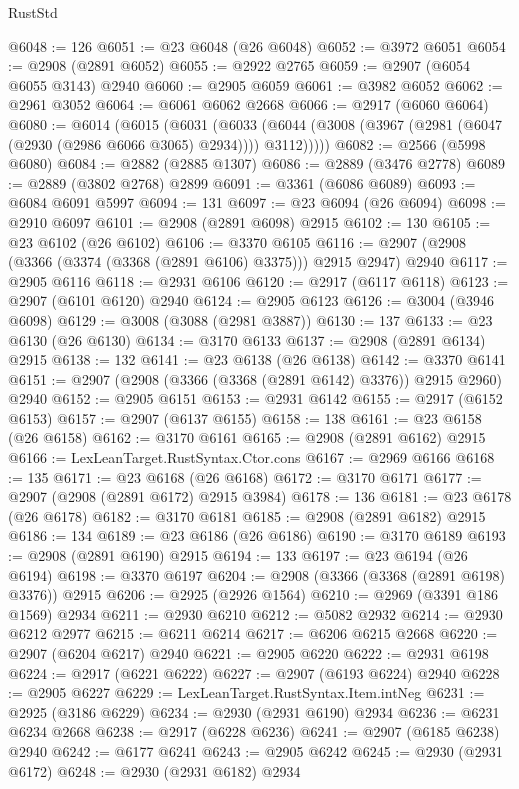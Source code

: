 \begin{lexlean}{RustStd}
\begin{coremodule}
@6048 := 126
@6051 := @23 @6048 (@26 @6048)
@6052 := @3972 @6051
@6054 := @2908 (@2891 @6052)
@6055 := @2922 @2765
@6059 := @2907 (@6054 @6055 @3143) @2940
@6060 := @2905 @6059
@6061 := @3982 @6052
@6062 := @2961 @3052
@6064 := @6061 @6062 @2668
@6066 := @2917 (@6060 @6064)
@6080 := @6014
    (@6015
      (@6031
        (@6033 (@6044 (@3008 (@3967 (@2981 (@6047 (@2930 (@2986 @6066 @3065) @2934)))) @3112)))))
@6082 := @2566 (@5998 @6080)
@6084 := @2882 (@2885 @1307)
@6086 := @2889 (@3476 @2778)
@6089 := @2889 (@3802 @2768) @2899
@6091 := @3361 (@6086 @6089)
@6093 := @6084 @6091 @5997
@6094 := 131
@6097 := @23 @6094 (@26 @6094)
@6098 := @2910 @6097
@6101 := @2908 (@2891 @6098) @2915
@6102 := 130
@6105 := @23 @6102 (@26 @6102)
@6106 := @3370 @6105
@6116 := @2907 (@2908 (@3366 (@3374 (@3368 (@2891 @6106) @3375))) @2915 @2947) @2940
@6117 := @2905 @6116
@6118 := @2931 @6106
@6120 := @2917 (@6117 @6118)
@6123 := @2907 (@6101 @6120) @2940
@6124 := @2905 @6123
@6126 := @3004 (@3946 @6098)
@6129 := @3008 (@3088 (@2981 @3887))
@6130 := 137
@6133 := @23 @6130 (@26 @6130)
@6134 := @3170 @6133
@6137 := @2908 (@2891 @6134) @2915
@6138 := 132
@6141 := @23 @6138 (@26 @6138)
@6142 := @3370 @6141
@6151 := @2907 (@2908 (@3366 (@3368 (@2891 @6142) @3376)) @2915 @2960) @2940
@6152 := @2905 @6151
@6153 := @2931 @6142
@6155 := @2917 (@6152 @6153)
@6157 := @2907 (@6137 @6155)
@6158 := 138
@6161 := @23 @6158 (@26 @6158)
@6162 := @3170 @6161
@6165 := @2908 (@2891 @6162) @2915
@6166 := LexLeanTarget.RustSyntax.Ctor.cons
@6167 := @2969 @6166
@6168 := 135
@6171 := @23 @6168 (@26 @6168)
@6172 := @3170 @6171
@6177 := @2907 (@2908 (@2891 @6172) @2915 @3984)
@6178 := 136
@6181 := @23 @6178 (@26 @6178)
@6182 := @3170 @6181
@6185 := @2908 (@2891 @6182) @2915
@6186 := 134
@6189 := @23 @6186 (@26 @6186)
@6190 := @3170 @6189
@6193 := @2908 (@2891 @6190) @2915
@6194 := 133
@6197 := @23 @6194 (@26 @6194)
@6198 := @3370 @6197
@6204 := @2908 (@3366 (@3368 (@2891 @6198) @3376)) @2915
@6206 := @2925 (@2926 @1564)
@6210 := @2969 (@3391 @186 @1569) @2934
@6211 := @2930 @6210
@6212 := @5082 @2932
@6214 := @2930 @6212 @2977
@6215 := @6211 @6214
@6217 := @6206 @6215 @2668
@6220 := @2907 (@6204 @6217) @2940
@6221 := @2905 @6220
@6222 := @2931 @6198
@6224 := @2917 (@6221 @6222)
@6227 := @2907 (@6193 @6224) @2940
@6228 := @2905 @6227
@6229 := LexLeanTarget.RustSyntax.Item.intNeg
@6231 := @2925 (@3186 @6229)
@6234 := @2930 (@2931 @6190) @2934
@6236 := @6231 @6234 @2668
@6238 := @2917 (@6228 @6236)
@6241 := @2907 (@6185 @6238) @2940
@6242 := @6177 @6241
@6243 := @2905 @6242
@6245 := @2930 (@2931 @6172)
@6248 := @2930 (@2931 @6182) @2934

\end{coremodule}
\end{lexlean}
